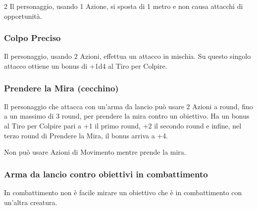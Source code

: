 \begin{multicols}{2}
Il personaggio, usando 1 Azione, si sposta di 1 metro e non causa attacchi di opportunità.



\subsubsection{Colpo Preciso} \label{colpopreciso}\hypertarget{colpopreciso}{}

Il personaggio, usando 2 Azioni, effettua un attacco in mischia. Su questo singolo attacco ottiene un bonus di +1d4 al Tiro per Colpire.

\subsubsection{Prendere la Mira (cecchino)} \label{cecchino}\hypertarget{cecchino}{}

Il personaggio che attacca con un'arma da lancio può usare 2 Azioni a round, fino a un massimo di 3 round, per prendere la mira contro un obiettivo. Ha un bonus al Tiro per Colpire pari a +1 il primo round, +2 il secondo round e infine, nel terzo round di Prendere la Mira, il bonus arriva a +4.

Non può usare Azioni di Movimento mentre prende la mira.

\subsubsection{Arma da lancio contro obiettivi in combattimento} \label{usarearmalancioinmischia}

In combattimento non è facile mirare un obiettivo che è in combattimento con un'altra creatura.


\end{multicols}
